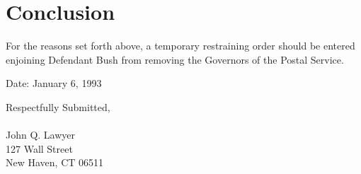 \documentclass[12pt,\documentclassflag]{lawbrief}
\begin{document}
\section{Conclusion}

For the reasons set forth above, a temporary restraining order should be entered enjoining Defendant Bush from removing the Governors of the Postal Service.

\noindent Date: January 6, 1993

\begin{rightbox}
Respectfully Submitted,\\
~\\
John Q. Lawyer\\
127 Wall Street\\
New Haven, CT 06511\\
\end{rightbox}
\end{document}
